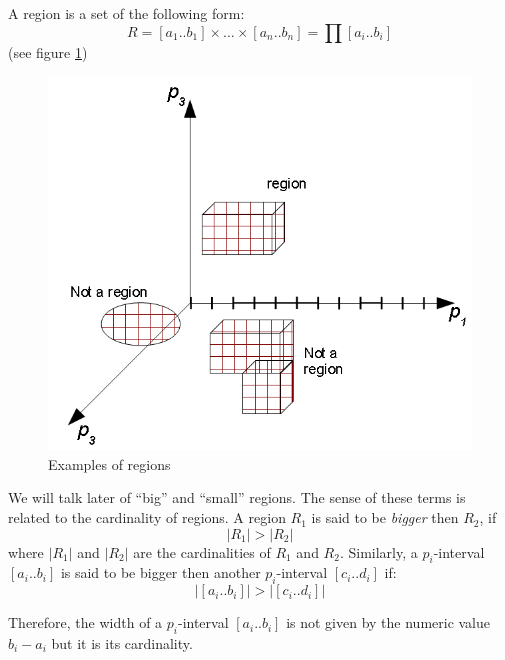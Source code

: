 \begin{definition}[Region]A region is a set of the following form:
\[
R=\left[a_{1}..b_{1}\right]\times\dots\times\left[a_{n}..b_{n}\right]=\prod\left[a_{i}..b_{i}\right]
\]
 (see figure \ref{pers02.fig:Examples-of-regions})

\begin{figure}[h]
\includegraphics[width=0.5\columnwidth]{img/regions}

\caption{\label{pers02.fig:Examples-of-regions}Examples of regions}


\end{figure}
\end{definition}

\begin{remark}
We will talk later of ``big'' and ``small'' regions. The sense
of these terms is related to the cardinality of regions. A region
$R_{1}$ is said to be \emph{bigger }then $R_{2}$, if
\[
\left|R_{1}\right|>\left|R_{2}\right|
\]
 where $\left|R_{1}\right|$ and $\left|R_{2}\right|$ are the cardinalities
of $R_{1}$ and $R_{2}$. Similarly, a $p_{i}$-interval $\left[a_{i}..b_{i}\right]$
is said to be bigger then another $p_{i}$-interval $\left[c_{i}..d_{i}\right]$
if:
\[
\left|\left[a_{i}..b_{i}\right]\right|>\left|\left[c_{i}..d_{i}\right]\right|
\]

Therefore, the width of a $p_{i}$-interval $\left[a_{i}..b_{i}\right]$
is not given by the numeric value $b_{i}-a_{i}$ but it is its cardinality.
\end{remark}

